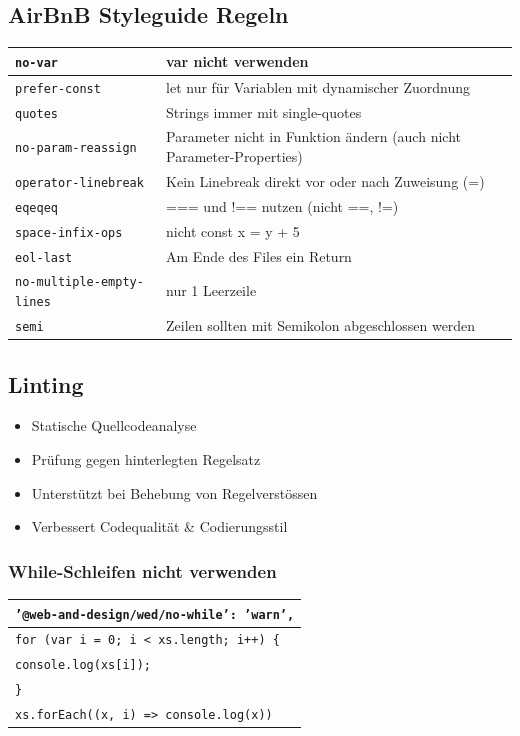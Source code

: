 \documentclass[a4paper, landscape, 8pt]{scrartcl}
\begin{document}
\begin{multicols*}{4}
        \subsection{AirBnB Styleguide {\tiny Regeln}}
        \begin{tabularx}{\columnwidth}{l | X}
            \texttt{no-var} & var nicht verwenden\\
            \hline
            \texttt{prefer-const} & let nur für Variablen mit dynamischer Zuordnung\\
            \hline
            \texttt{quotes} & Strings immer mit single-quotes\\
            \hline
            \texttt{no-param-reassign} & Parameter nicht in Funktion ändern (auch nicht Parameter-Properties)\\
            \hline
            \texttt{operator-linebreak} & Kein Linebreak direkt vor oder nach Zuweisung (=)\\
            \hline
            \texttt{eqeqeq} & === und !== nutzen (nicht ==, !=)\\
            \hline
            \texttt{space-infix-ops} & nicht const x = y + 5\\
            \hline
            \texttt{eol-last} & Am Ende des Files ein Return\\
            \hline
            \texttt{no-multiple-empty-lines} & nur 1 Leerzeile\\
            \hline
            \texttt{semi} & Zeilen sollten mit Semikolon abgeschlossen werden\\
        \end{tabularx}

        \subsection{Linting}
        \begin{itemize}
            \item Statische Quellcodeanalyse
            \item Prüfung gegen hinterlegten Regelsatz
            \item Unterstützt bei Behebung von Regelverstössen
            \item Verbessert Codequalität \& Codierungsstil
        \end{itemize}

        \subsubsection{While-Schleifen nicht verwenden}
        \begin{tabularx}{\columnwidth}{X}
            \texttt{'@web-and-design/wed/no-while': 'warn',} \\
            \hline
            \texttt{for (var i = 0; i < xs.length; i++) \{} \\
            \texttt{console.log(xs[i]);} \\
            \texttt{\}} \\
            \hline
            \texttt{xs.forEach((x, i) => console.log(x))}
        \end{tabularx}


\end{multicols*}
\end{document}
